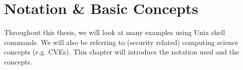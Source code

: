 \chapter{Notation \& Basic Concepts}\label{chapter:notation}
Throughout this thesis, we will look at many examples using Unix shell commands. We will also be referring to (security related) computing science concepts (e.g. CVEs). This chapter will introduce the notation used and the concepts.





